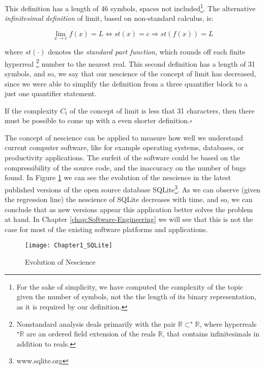 This definition has a length of 46 symbols, spaces not included\footnote{
For the sake of simplicity, we have computed the complexity of the
topic given the number of symbols, not the the length of its binary
representation, as it is required by our definition.}. The alternative \emph{infinitesimal definition} of limit, based
on non-standard calculus, is:

\[
\lim_{x\rightarrow c}f(x)=L\Leftrightarrow st(x)=c\Rightarrow st(f(x))=L
\]

where $st(\cdot)$ denotes the \emph{standard part function}, which \textquotedbl{}rounds off\textquotedbl{} each finite hyperreal%
\footnote{Nonstandard analysis deals primarily with the pair $\mathbb{R\subset^{\star}\mathbb{R}}$,
where hyperreals $^{\star}\mathbb{R}$ are an ordered field extension
of the reals $\mathbb{R}$, that contains infinitesimals in addition
to reals.%
} number to the nearest real. This second definition has a length of 31 symbols, and so, we say that our nescience of the concept of limit has decreased, since we were able to simplify the definition from a three quantifier block to a just one quantifier statement.

If the complexity $C_{t}$ of the concept of limit is less that 31 characters, then there must be possible to come up with a even shorter definition.\hfill{}$\square$

\begin{example}
The concept of nescience can be applied to measure how well we understand current computer software, like for example operating systems, databases, or productivity applications. The surfeit of the software could be based on the compressibility of the source code, and the inaccuracy on the number of bugs found. In Figure \ref{fig:Chapter1_SQLite} we can see the evolution of the nescience in the latest published versions of the open source database SQLite\footnote{www.sqlite.org}. As we can observe (given the regression line) the nescience of SQLite decreases with time, and so, we can conclude that as new versions appear this application better solves the problem at hand. In Chapter \ref{chap:Software-Engineering} we will see that this is not the case for most of the existing software platforms and applications.
\end{example}

\begin{figure}[h]
\centering\texttt{[image: Chapter1\_SQLite]}
\caption{\label{fig:Chapter1_SQLite}Evolution of Nescience}
\end{figure}

